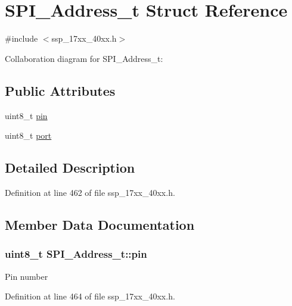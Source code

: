 \hypertarget{structSPI__Address__t}{}\section{S\+P\+I\+\_\+\+Address\+\_\+t Struct Reference}
\label{structSPI__Address__t}


{\ttfamily \#include $<$ssp\+\_\+17xx\+\_\+40xx.\+h$>$}



Collaboration diagram for S\+P\+I\+\_\+\+Address\+\_\+t\+:
\subsection*{Public Attributes}
\begin{DoxyCompactItemize}
\item 
uint8\+\_\+t \hyperlink{structSPI__Address__t_aa89aa381abb683131e6d7b3158b25155}{pin}
\item 
uint8\+\_\+t \hyperlink{structSPI__Address__t_a64ccbaf37a32da0f13b46325b4b42c4d}{port}
\end{DoxyCompactItemize}


\subsection{Detailed Description}


Definition at line 462 of file ssp\+\_\+17xx\+\_\+40xx.\+h.



\subsection{Member Data Documentation}
\subsubsection[{\texorpdfstring{pin}{pin}}]{\setlength{\rightskip}{0pt plus 5cm}uint8\+\_\+t S\+P\+I\+\_\+\+Address\+\_\+t\+::pin}\hypertarget{structSPI__Address__t_aa89aa381abb683131e6d7b3158b25155}{}\label{structSPI__Address__t_aa89aa381abb683131e6d7b3158b25155}
Pin number 

Definition at line 464 of file ssp\+\_\+17xx\+\_\+40xx.\+h.

